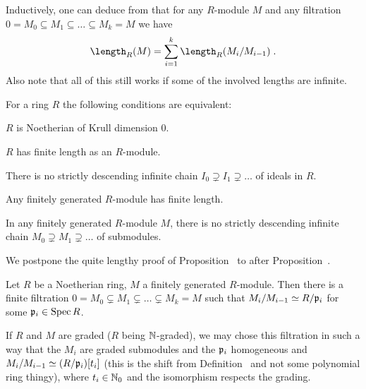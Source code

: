 \documentclass[a4paper,parskip=half,numbers=enddot, DIV=12, headheight=30pt]{scrreprt}
\begin{document}
\begin{rem}
\begin{alphanumerate}
        \item Inductively, one can deduce from  that for any $R$-module $M$ and any filtration $0=M_0\subseteq M_1\subseteq \ldots\subseteq M_k=M$ we have 
        \begin{align*}
        	\length_R(M)=\sum_{i=1}^{k}\length_R(M_i/M_{i-1})\;.
        \end{align*}
        Also note that all of this still works if some of the involved lengths are infinite.
    \end{alphanumerate}
\end{rem}
\begin{prop} 
    For a ring $R$ the following conditions are equivalent:
    \begin{alphanumerate}
    \item
        $R$ is Noetherian of Krull dimension $0$.
    \item  
        $R$ has finite length as an $R$-module.
    \item
        There is no strictly descending infinite chain $I_0\supsetneq I_1\supsetneq\ldots $ of ideals in $R$.
    \item
        Any finitely generated $R$-module has finite length.
    \item 
        In any finitely generated $R$-module $M$, there is no strictly descending infinite chain $M_0\supsetneq M_1\supsetneq \ldots$ of submodules.
    \end{alphanumerate}
\end{prop}
We postpone the quite lengthy proof of Proposition~ to after Proposition~.
\begin{prop}
    \begin{alphanumerate}
    \item {}
        Let $R$ be a Noetherian ring, $M$ a finitely generated $R$-module. Then there is a finite filtration $0 = M_0\subsetneq M_1\subsetneq\ldots\subsetneq M_k = M$ such that $M_i/M_{i-1} \simeq R/\mathfrak{p}_i$ for some $\mathfrak{p}_i\in \operatorname{Spec} R$.
    \item  
        If $R$ and $M$ are graded ($R$ being $\mathbb{N}$-graded), we may chose this filtration in such a way that the $M_i$ are graded submodules and the $\mathfrak{p}_i$ homogeneous and $M_i/M_{i-1} \simeq (R/\mathfrak{p}_i)[t_i]$ (this is the shift from Definition~ and not some polynomial ring thingy), where $t_i\in \mathbb{N}_0$ and the isomorphism respects the grading.
    \end{alphanumerate}
\end{prop}
\end{document}
